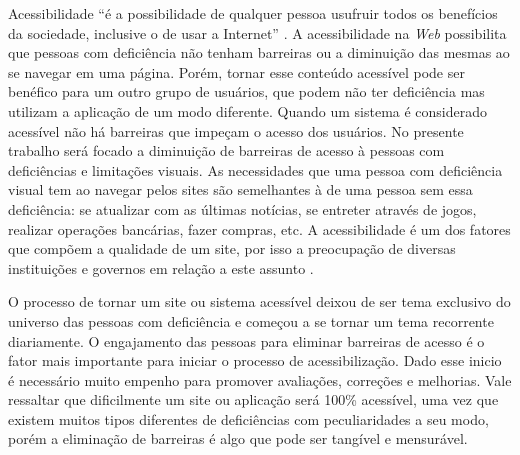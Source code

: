 { {Acessibilidade “é a possibilidade de qualquer pessoa usufruir todos os benefícios
da sociedade, inclusive o de usar a Internet” \cite{Ferreira_2015}. A acessibilidade na \textit{\textit{Web}} possibilita que pessoas com deficiência não tenham barreiras ou a diminuição das mesmas ao se navegar em uma página. Porém, tornar esse conteúdo acessível pode ser benéfico para um outro grupo de usuários, que podem não ter deficiência mas utilizam a aplicação de um modo diferente. \newpage
Quando um sistema é considerado acessível não há barreiras que impeçam o acesso dos usuários. No presente trabalho será focado a diminuição de barreiras de acesso à pessoas com deficiências e limitações visuais. As necessidades que uma pessoa com deficiência visual tem ao navegar pelos sites são semelhantes à de uma pessoa sem essa deficiência: se atualizar com as últimas notícias, se entreter através de jogos, realizar operações bancárias, fazer compras, etc. A acessibilidade é um dos fatores que compõem a qualidade de um site, por isso a preocupação de diversas instituições e governos em relação a este assunto \cite{sbqs}.

O processo de tornar um site ou sistema acessível deixou de ser tema exclusivo do universo das pessoas com deficiência e começou a se tornar um tema recorrente diariamente. O engajamento das pessoas para eliminar barreiras de acesso é o fator mais importante para iniciar o processo de acessibilização. Dado esse inicio é necessário muito empenho para promover avaliações, correções e melhorias. Vale ressaltar que dificilmente um site ou aplicação será 100\% acessível, uma vez que existem muitos tipos diferentes de deficiências com peculiaridades a seu modo, porém a eliminação de barreiras é algo que pode ser tangível e mensurável. 
 }


}
